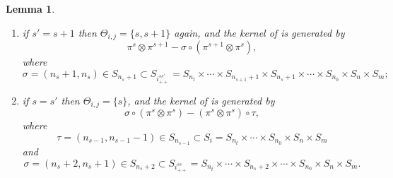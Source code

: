 \documentclass[11pt]{article}
\theoremstyle{plain}
\newtheorem{lemma}{Lemma}[section]
\theoremstyle{nonumberplain}
\theoremstyle{plain}
\theoremstyle{nonumberplain}
\begin{document}
\begin{lemma}
\begin{enumerate}
\begin{enumerate}
    \item if $s'=s+1$ then $\Theta_{i,j}=\{s,s+1\}$ again, and the
      kernel of  is generated by
      \begin{equation}\label{eq:ss1}
        \pi^s\otimes\pi^{s+1}-\sigma\circ (\pi^{s+1}\otimes\pi^s), 
      \end{equation}
      where
      \begin{equation*}
        \sigma=(n_s+1,n_s)\in S_{n_s+1}\subset S_{i^{ss'}_{++}}=S_{n_t}\times\cdots\times S_{n_{s+1}+1}\times S_{n_s+1}\times\cdots \times S_{n_0}\times S_n\times S_m;
      \end{equation*}      
    \item if $s=s'$ then $\Theta_{i,j}=\{s\}$, and the kernel of
       is generated by
      \begin{equation*}
        \sigma\circ(\pi^s\otimes\pi^s)-(\pi^s\otimes \pi^s)\circ\tau,
      \end{equation*}
      where
      \begin{equation*}
        \tau=(n_{s-1},n_{s-1}-1)\in S_{n_{s-1}}\subset S_i = S_{n_t}\times\cdots \times S_{n_0}\times S_{n}\times S_m
      \end{equation*}
      and
      \begin{equation*}
        \sigma=(n_s+2,n_s+1)\in S_{n_s+2}\subset S_{i^{ss}_{++}} = S_{n_t}\times\cdots\times S_{n_s+2}\times\cdots\times S_{n_0}\times S_{n}\times S_m.
      \end{equation*}      
    \end{enumerate}
  \end{enumerate}
\end{lemma}
\end{document}
